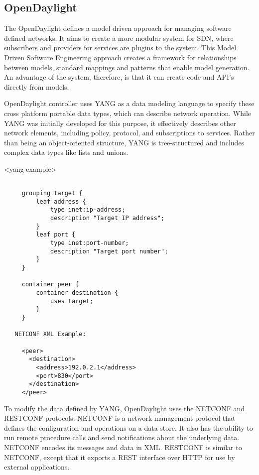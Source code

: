 \documentclass[letterpaper,twocolumn,10pt]{article}
\begin{document}
% 
% 
\subsection{OpenDaylight}

The OpenDaylight defines a model driven approach for managing software defined networks. It aims to create a more modular system for SDN, where subscribers and providers for services are plugins to the system. This Model Driven Software Engineering approach creates a framework for relationships between models, standard mappings and patterns that enable model generation. An advantage of the system, therefore, is that it can create code and API's directly from models.

OpenDaylight controller uses YANG as a data modeling language to specify these cross platform portable data types, which can describe network operation. While YANG was initially developed for this purpose, it effectively describes other network elements, including policy, protocol, and subscriptions to services. Rather than being an object-oriented structure, YANG is tree-structured and includes complex data types like lists and unions.

<yang example>
\begin{lstlisting}

     grouping target {
         leaf address {
             type inet:ip-address;
             description "Target IP address";
         }
         leaf port {
             type inet:port-number;
             description "Target port number";
         }
     }

     container peer {
         container destination {
             uses target;
         }
     }

   NETCONF XML Example:

     <peer>
       <destination>
         <address>192.0.2.1</address>
         <port>830</port>
       </destination>
     </peer>
\end{lstlisting}


To modify the data defined by YANG, OpenDaylight uses the NETCONF and RESTCONF protocols. NETCONF is a network management protocol that defines the configuration and operations on a data store. It also has the ability to run remote procedure calls and send notifications about the underlying data. NETCONF encodes its messages and data in XML. RESTCONF is similar to NETCONF, except that it exports a REST interface over HTTP for use by external applications.
\end{document}

